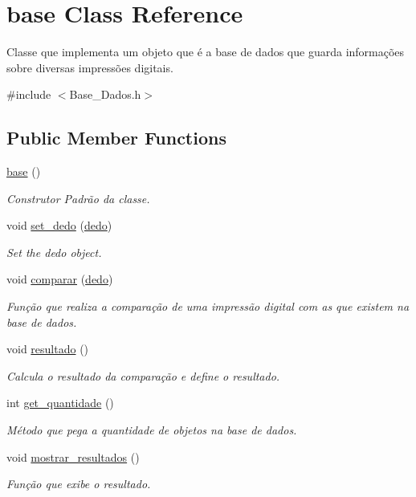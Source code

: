 \hypertarget{classbase}{}\section{base Class Reference}
\label{classbase}


Classe que implementa um objeto que é a base de dados que guarda informações sobre diversas impressões digitais.  




{\ttfamily \#include $<$Base\+\_\+\+Dados.\+h$>$}

\subsection*{Public Member Functions}
\begin{DoxyCompactItemize}
\item 
\mbox{\hyperlink{classbase_a3b0362be8b58605e4975b969dd8131a4}{base}} ()
\begin{DoxyCompactList}\small\item\em Construtor Padrão da classe. \end{DoxyCompactList}\item 
void \mbox{\hyperlink{classbase_aff56c74591768308bb3cfbcde7901926}{set\+\_\+dedo}} (\mbox{\hyperlink{classdedo}{dedo}})
\begin{DoxyCompactList}\small\item\em Set the dedo object. \end{DoxyCompactList}\item 
void \mbox{\hyperlink{classbase_a32a63a8bc58d7b21224f3a1caf59ed02}{comparar}} (\mbox{\hyperlink{classdedo}{dedo}})
\begin{DoxyCompactList}\small\item\em Função que realiza a comparação de uma impressão digital com as que existem na base de dados. \end{DoxyCompactList}\item 
void \mbox{\hyperlink{classbase_a4d2dd9457866115cc595e612b340c04f}{resultado}} ()
\begin{DoxyCompactList}\small\item\em Calcula o resultado da comparação e define o resultado. \end{DoxyCompactList}\item 
int \mbox{\hyperlink{classbase_a8d7e8978652ae605ab038286cfeb24fb}{get\+\_\+quantidade}} ()
\begin{DoxyCompactList}\small\item\em Método que pega a quantidade de objetos na base de dados. \end{DoxyCompactList}\item 
void \mbox{\hyperlink{classbase_a4de5d06607b9f92a158d8dd88d9775fc}{mostrar\+\_\+resultados}} ()
\begin{DoxyCompactList}\small\item\em Função que exibe o resultado. \end{DoxyCompactList}\end{DoxyCompactItemize}


